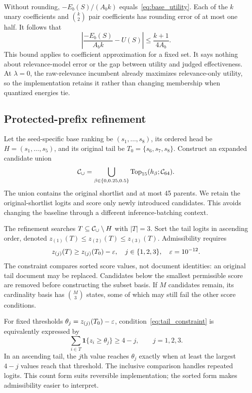 Without rounding, $-E_b(S)/(A_bk)$ equals~\eqref{eq:base_utility}. Each of the $k$ unary coefficients and $\binom{k}{2}$ pair coefficients has rounding error of at most one half. It follows that
\begin{equation}
\left|\frac{-E_b(S)}{A_bk}-U(S)\right|\leq\frac{k+1}{4A_b}.
\label{eq:base_quantization}
\end{equation}
This bound applies to coefficient approximation for a fixed set. It says nothing about relevance-model error or the gap between utility and judged effectiveness. At $\lambda=0$, the raw-relevance incumbent already maximizes relevance-only utility, so the implementation retains it rather than changing membership when quantized energies tie.

\subsection{Protected-prefix refinement}
Let the seed-specific base ranking be $(s_1,\ldots,s_8)$, its ordered head be $H=(s_1,\ldots,s_5)$, and its original tail be $T_0=\{s_6,s_7,s_8\}$. Construct an expanded candidate union
\begin{equation}
\mathcal{C}_{\cup}=\bigcup_{\beta\in\{0,0.25,0.5\}}\operatorname{Top}_{15}(h_{\beta};\mathcal{C}_{64}).
\label{eq:union}
\end{equation}
The union contains the original shortlist and at most 45 parents. We retain the original-shortlist logits and score only newly introduced candidates. This avoids changing the baseline through a different inference-batching context.

The refinement searches $T\subseteq\mathcal{C}_{\cup}\setminus H$ with $|T|=3$. Sort the tail logits in ascending order, denoted $z_{(1)}(T)\leq z_{(2)}(T)\leq z_{(3)}(T)$. Admissibility requires
\begin{equation}
z_{(j)}(T)\geq z_{(j)}(T_0)-\varepsilon,\quad j\in\{1,2,3\},\quad\varepsilon=10^{-12}.
\label{eq:tail_constraint}
\end{equation}
The constraint compares sorted score values, not document identities: an original tail document may be replaced. Candidates below the smallest permissible score are removed before constructing the subset basis. If $M$ candidates remain, its cardinality basis has $\binom{M}{3}$ states, some of which may still fail the other score conditions.

For fixed thresholds $\theta_j=z_{(j)}(T_0)-\varepsilon$, condition~\eqref{eq:tail_constraint} is equivalently expressed by
\begin{equation}
\sum_{i\in T}\mathbf{1}\{z_i\geq\theta_j\}\geq4-j,\qquad j=1,2,3.
\label{eq:threshold_counts}
\end{equation}
In an ascending tail, the $j$th value reaches $\theta_j$ exactly when at least the largest $4-j$ values reach that threshold. The inclusive comparison handles repeated logits. This count form suits reversible implementation; the sorted form makes admissibility easier to interpret.

